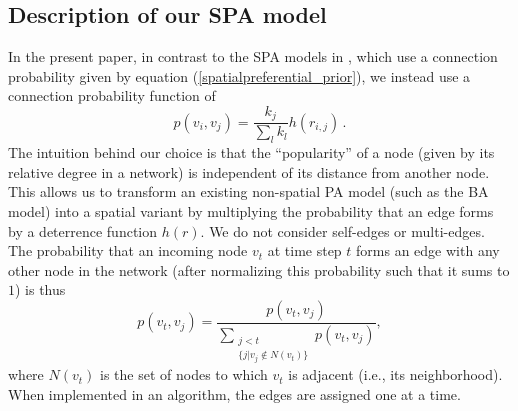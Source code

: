 \documentclass[%
 reprint,
 amsmath,amssymb,
 aps,
]{revtex4-1}
\begin{document}


\subsection{Description of our SPA model}

{\color{red}In the present paper, in contrast to the SPA models in \cite{SPA1,SPA2,SPA3}, which use a connection probability given by equation (\ref{spatialpreferential_prior}), we instead use a connection probability function of}
\begin{equation} \label{spatialpreferential}
    p(v_i,v_j) = \frac{k_j}{\sum_l k_l}h(r_{i,j})\,.
\end{equation}
The intuition behind our choice is that the ``popularity'' of a node (given by its relative degree in a network) is independent of its distance from another node. This allows us to transform an existing non-spatial PA model (such as the BA model) into a spatial variant by multiplying the probability that an edge forms by a deterrence function $h(r)$. {\color{red}We do not consider self-edges or multi-edges. The probability that an incoming node $v_t$ at time step $t$ forms an edge with any other node in the network (after normalizing this probability such that it sums to $1$) is thus
\begin{equation} \label{spatialpreferential_normalized}
p(v_t, v_j) = \frac{p(v_t, v_j)}{\sum\limits_{\substack{j < t \\ \{j  |  v_j \not\in N(v_t)\}}} p(v_t, v_j)},
\end{equation}
where $N(v_t)$ is the set of nodes to which $v_t$ is adjacent (i.e., its neighborhood). When implemented in an algorithm, the edges are assigned one at a time.}
\end{document}

